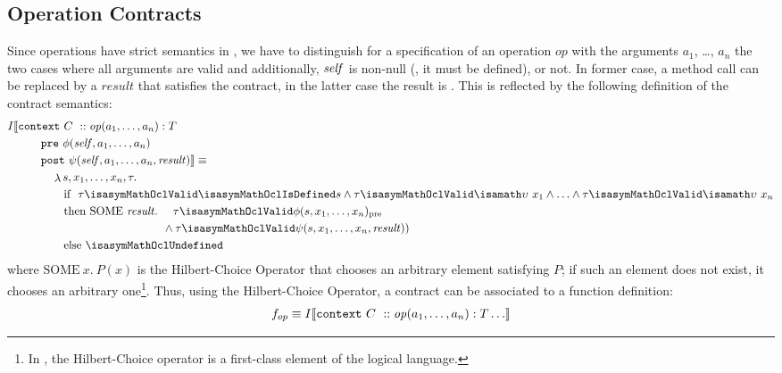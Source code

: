 \subsection{Operation Contracts}
Since operations have strict semantics in \OCL, we have to distinguish for a specification of an
operation $\mathit{op}$ with the arguments $a_1$, \ldots, $a_n$ the
two cases where all arguments are valid and additionally, $\mathit{self}$ is non-null (\ie, it must be defined), or not.
In former case, a method call can be replaced by a $\mathit{result}$
that satisfies the contract, in the latter case the result is
. This is reflected by the following definition of the contract semantics:
\begin{gather}\label{eq:contract}
\begin{aligned}
 I\semantics{& \mathtt{context}~C~:: \mathit{op}(a_1, \ldots, a_n) : T \\
                     & \qquad\mathtt{pre}~ \phi(\self, a_1, \ldots, a_n)  \\
                     & \qquad\mathtt{post}~\psi(\self, a_1, \ldots, a_n, \mathit{result})}  \equiv \\
 & \qquad \quad \lambda  s,  x_1, \ldots, x_n, \tau.  \\
 & \qquad\qquad \text{if}  ~ ~ \tau
\isasymMathOclValid \isasymMathOclIsDefined s \land \tau \isasymMathOclValid
\isasymupsilon~x_1 \land \ldots \land  \tau \isasymMathOclValid
\isasymupsilon~ x_n \\
 & \qquad\qquad \text{then} ~ \text{SOME}~ \mathit{result}. ~ ~ ~ ~\tau \isasymMathOclValid \phi(s, x_1, \ldots, x_n)_\text{pre} \\
 & \qquad\qquad\qquad\qquad\qquad\qquad ~ ~          \land \tau \isasymMathOclValid \psi(s, x_1, \ldots, x_n, \mathit{result}))\\
 &\qquad\qquad  \text{else}  ~  \isasymMathOclUndefined
\end{aligned}
\end{gather}
where $\text{SOME}~ x. ~P(x)$ is the Hilbert-Choice Operator that
chooses an arbitrary element satisfying $P$; if such an element does not exist, it chooses
an arbitrary one\footnote{In \HOL, the Hilbert-Choice operator is a first-class element of
the logical language.}. Thus, using the Hilbert-Choice Operator, a contract can be associated
to a function definition:
\begin{gather}\label{eq:contractdef}
    f_{op}  \equiv I\llbracket  \mathtt{context}~C~:: \mathit{op}(a_1, \ldots, a_n) : T \ldots  \rrbracket
\end{gather}

